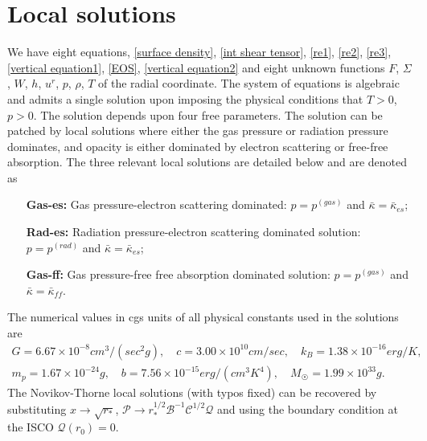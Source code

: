 \documentclass[a4paper,fleqn,usenatbib]{mnrasMOD}
\numberwithin{equation}{section}
\newcommand{\bea}{\begin{eqnarray}}
\newcommand{\eea}{\end{eqnarray}}
\begin{document}
\onecolumn
\section{Local solutions} \label{Solutions}

We have eight equations, \eqref{surface density}, \eqref{int shear tensor}, \eqref{re1}, \eqref{re2}, \eqref{re3}, \eqref{vertical equation1},  \eqref{EOS}, \eqref{vertical equation2} and eight unknown functions $F$, $\Sigma$, $W$, $h$, $u^{r}$, $p$, $\rho$, $T$ of the radial coordinate. The system of equations is algebraic and admits  a single solution upon imposing the physical conditions that $T>0$, $p>0$. The solution depends upon four free parameters. The solution can be patched by local solutions where either the gas pressure or radiation pressure dominates, and opacity is either dominated by electron scattering or free-free absorption. The three relevant local solutions are detailed below and are denoted as 
\begin{enumerate}
\item[\bf Gas-es:] Gas pressure-electron scattering dominated: $p=p^{(gas)}$ and $\bar{\kappa} = \bar{\kappa}_{es}$;
\item[\bf Rad-es:] Radiation pressure-electron scattering dominated solution: $p=p^{(rad)}$ and $\bar{\kappa} = \bar{\kappa}_{es}$;
\item[\bf Gas-ff:] Gas pressure-free free absorption dominated solution: $p=p^{(gas)}$ and $\bar{\kappa} = \bar{\kappa}_{ff}$.
\end{enumerate} 
The numerical values in cgs units of all physical constants used in the solutions are
\bea
G = 6.67 \times 10^{-8} cm^3/(sec^2 g), \quad c = 3.00 \times 10^{10} cm/sec, \quad k_{B} = 1.38  \times 10^{-16} erg/K, \nonumber \\
m_{p} = 1.67  \times 10^{-24} g, \quad  b = 7.56 \times 10^{-15} erg/(cm^3 K^4), \quad M_{\astrosun} = 1.99  \times 10^{33} g.
\eea
The Novikov-Thorne local solutions (with typos fixed) can be recovered by substituting $x \rightarrow \sqrt{r_*}$, $\mathcal P \rightarrow r_*^{1/2} \mathcal B^{-1}\mathcal C^{1/2} \mathcal Q$ and using the boundary condition at the ISCO $\mathcal Q(r_0)=0$.
\end{document}
